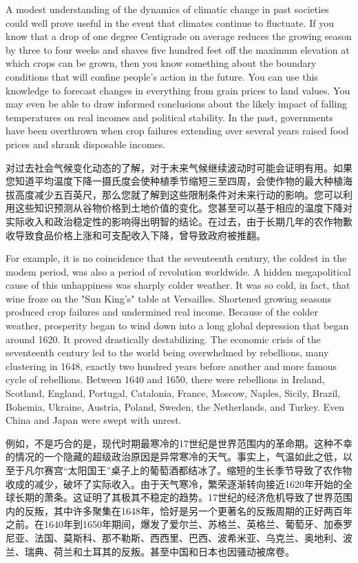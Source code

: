 \begin{Parallel}{97mm}{72mm}
  \ParallelLText
  {A modest understanding of the dynamics of climatic change in past societies could well prove useful in the event that climates continue to fluctuate. If you know that a drop of one degree Centigrade on average reduces the growing season by three to four weeks and shaves five hundred feet off the maximum elevation at which crops can be grown, then you know something about the boundary conditions that will confine people's action in the future. You can use this knowledge to forecast changes in everything from grain prices to land values. You may even be able to draw informed conclusions about the likely impact of falling temperatures on real incomes and political stability. In the past, governments have been overthrown when crop failures extending over several years raised food prices and shrank disposable incomes.}
  
  \ParallelRText
  {对过去社会气候变化动态的了解，对于未来气候继续波动时可能会证明有用。如果您知道平均温度下降一摄氏度会使种植季节缩短三至四周，会使作物的最大种植海拔高度减少五百英尺，那么您就了解到这些限制条件对未来行动的影响。您可以利用这些知识预测从谷物价格到土地价值的变化。您甚至可以基于相应的温度下降对实际收入和政治稳定性的影响得出明智的结论。在过去，由于长期几年的农作物歉收导致食品价格上涨和可支配收入下降，曾导致政府被推翻。}
  \ParallelPar


  \ParallelLText
  {For example, it is no coincidence that the seventeenth century, the coldest in the modem period, was also a period of revolution worldwide. A hidden megapolitical cause of this unhappiness was sharply colder weather. It was so cold, in fact, that wine froze on the "Sun King's" table at Versailles. Shortened growing seasons produced crop failures and undermined real income. Because of the colder weather, prosperity began to wind down into a long global depression that began around 1620. It proved drastically destabilizing. The economic crisis of the seventeenth century led to the world being overwhelmed by rebellions, many clustering in 1648, exactly two hundred years before another and more famous cycle of rebellions. Between 1640 and 1650, there were rebellions in Ireland, Scotland, England, Portugal, Catalonia, France, Moscow, Naples, Sicily, Brazil, Bohemia, Ukraine, Austria, Poland, Sweden, the Netherlands, and Turkey. Even China and Japan were swept with unrest.}
  
  \ParallelRText
  {例如，不是巧合的是，现代时期最寒冷的17世纪是世界范围内的革命期。这种不幸的情况的一个隐藏的超级政治原因是异常寒冷的天气。事实上，气温如此之低，以至于凡尔赛宫“太阳国王”桌子上的葡萄酒都结冰了。缩短的生长季节导致了农作物收成的减少，破坏了实际收入。由于天气寒冷，繁荣逐渐转向接近1620年开始的全球长期的萧条。这证明了其极其不稳定的趋势。17世纪的经济危机导致了世界范围内的反叛，其中许多聚集在1648年，恰好是另一个更著名的反叛周期的正好两百年之前。在1640年到1650年期间，爆发了爱尔兰、苏格兰、英格兰、葡萄牙、加泰罗尼亚、法国、莫斯科、那不勒斯、西西里、巴西、波希米亚、乌克兰、奥地利、波兰、瑞典、荷兰和土耳其的反叛。甚至中国和日本也因骚动被席卷。}
  \ParallelPar




\end{Parallel}
